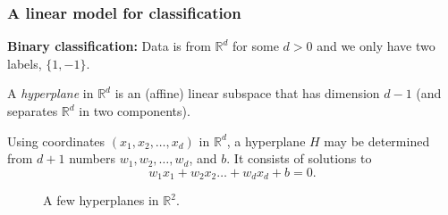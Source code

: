 \documentclass{beamer}
\theoremstyle{example}
\begin{document}
\begin{frame}
\frametitle{A linear model for classification}
    \textbf{Binary classification:} Data is from $\mathbb R^d$ for some $d>0$ and we only have two labels, $\{1, -1\}$. %
    \pause

    A \emph{hyperplane} in $\mathbb R^d$ is an (affine) linear subspace that has dimension $d-1$ (and separates $\mathbb R^d$ in two components). %
    \pause

    Using coordinates $(x_1,x_2, \ldots, x_d)$ in $\mathbb R^d$, a hyperplane $H$ may be determined from $d+1$ numbers $w_1,w_2,\ldots,w_d$, and $b$. It consists of solutions to 
        \[w_1x_1 + w_2x_2\ldots + w_dx_d + b = 0.\]

    \pause
    \begin{figure}[h!]
        \centering
        \caption{A few hyperplanes in $\mathbb R^2$.}
        \label{figure:hyperplanes}
    \end{figure}

\end{frame}
\end{document}
